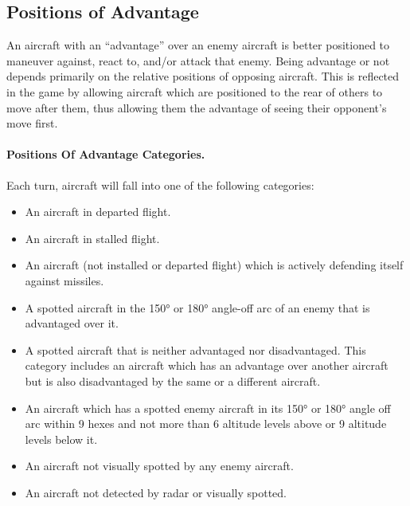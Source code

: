 \subsection{Positions of Advantage}

An aircraft with an “advantage” over an enemy aircraft is better positioned to maneuver against, react to, and/or attack that enemy. Being advantage or not depends primarily on the relative positions of opposing aircraft. This is reflected in the game by allowing aircraft which are positioned to the rear of others to move after them, thus allowing them the advantage of seeing their opponent's move first.

\paragraph{Positions Of Advantage Categories.} Each turn, aircraft will fall into one of the following categories:

\begin{itemize}

    \item{} An aircraft in departed flight.

    \item{} An aircraft in stalled flight.

    \item{} An aircraft (not installed or departed flight) which is actively defending itself against missiles.

    \item{} A spotted aircraft in the 150° or 180° angle-off arc of an enemy that is advantaged over it.

    \item{} A spotted aircraft that is neither advantaged nor disadvantaged. This category includes an aircraft which has an advantage over another aircraft but is also disadvantaged by the same or a different aircraft.

    \item{} An aircraft which has a spotted enemy aircraft in its 150° or 180° angle off arc within 9 hexes and not more than 6 altitude levels above or 9 altitude levels below it. 

    \item{} An aircraft not visually spotted by any enemy aircraft.

    \item{} An aircraft not detected by radar or visually spotted.

\end{itemize}

